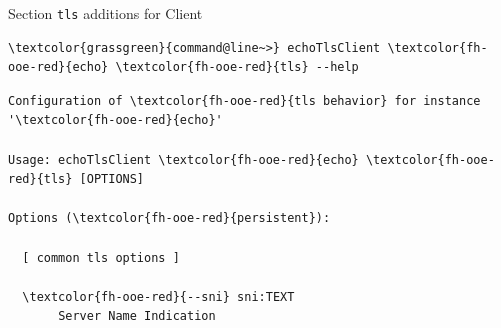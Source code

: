 \begin{frame}[fragile]{Section \alert{\lstinline|tls|} additions for Client}
\begin{scriptsize}
\begin{Verbatim}[commandchars=\\\{\}]
\textcolor{grassgreen}{command@line~>} echoTlsClient \textcolor{fh-ooe-red}{echo} \textcolor{fh-ooe-red}{tls} --help
\end{Verbatim}
\begin{Verbatim}[commandchars=\\\{\},frame=leftline,rulecolor=\color{fh-ooe-red}]
Configuration of \textcolor{fh-ooe-red}{tls behavior} for instance '\textcolor{fh-ooe-red}{echo}'

Usage: echoTlsClient \textcolor{fh-ooe-red}{echo} \textcolor{fh-ooe-red}{tls} [OPTIONS]

Options (\textcolor{fh-ooe-red}{persistent}):

  [ common tls options ]

  \textcolor{fh-ooe-red}{--sni} sni:TEXT
       Server Name Indication
\end{Verbatim}
\end{scriptsize}
\end{frame}
